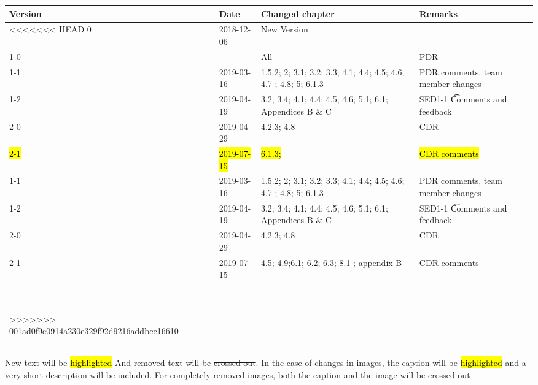 \begin{longtable}{|p{1.5cm}|p{2cm}|p{6cm}|p{3cm}|}\hline
\centering
\textbf{Version} & \textbf{Date} & \textbf{Changed chapter} & \textbf{Remarks}  \\\hline
<<<<<<< HEAD
0       & 2018-12-06        & New Version                                                           &                                       \\\hline
1-0     &                   & All                                                                   & PDR                                   \\\hline
1-1     & 2019-03-16        & 1.5.2; 2; 3.1; 3.2; 3.3; 4.1; 4.4; 4.5; 4.6; 4.7 ; 4.8; 5; 6.1.3      & PDR comments, team member changes     \\\hline
1-2     & 2019-04-19        & 3.2; 3.4; 4.1; 4.4; 4.5; 4.6; 5.1; 6.1; Appendices B \& C             & SED1-1 \t Comments and feedback       \\\hline
2-0     & 2019-04-29        & 4.2.3; 4.8                                                            & CDR                                   \\\hline
\hl{2-1}& \hl{2019-07-15}   & \hl{6.1.3; }                                                          & \hl{CDR comments}                     \\\hline

1-1		& 2019-03-16	& 1.5.2; 2; 3.1; 3.2; 3.3; 4.1; 4.4; 4.5; 4.6; 4.7 ; 4.8; 5; 6.1.3		& PDR comments, team member changes 			\\\hline
1-2		& 2019-04-19 	& 3.2; 3.4; 4.1; 4.4; 4.5; 4.6; 5.1; 6.1; Appendices B \& C 			& SED1-1 \t Comments and feedback \\\hline
2-0 & 2019-04-29 & 4.2.3; 4.8													& CDR \\\hline
2-1 & 2019-07-15 & 4.5; 4.9;6.1; 6.2; 6.3; 8.1 ; appendix B												& CDR comments \\\hline

=======

>>>>>>> 001ad0f9e0914a230e329f92d9216addbce16610
\end{longtable}       

New text will be \hl{highlighted} And removed text will be \st{crossed out}. In the case of changes in images, the caption will be \hl{highlighted} and a very short description will be included. For completely removed images, both the caption and the image will be \st{crossed out} 
